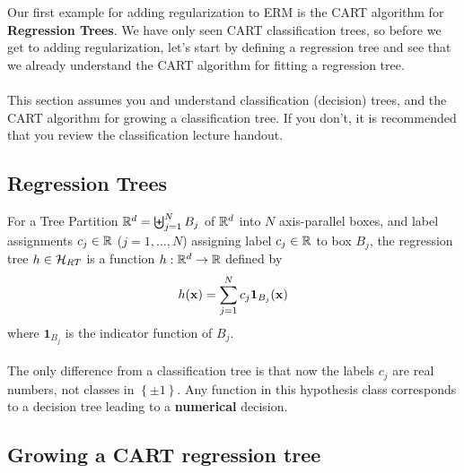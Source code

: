     Our first example for adding regularization to ERM is the CART algorithm for
    {\bf Regression Trees}. We have only seen CART classification trees, so before we
    get to adding regularization, let's
    start by defining a regression tree and see that we already understand the
    CART algorithm for fitting a regression tree.
\\~\\
     This section assumes you and understand classification (decision)
    trees, and the CART algorithm for growing a classification tree. If you
    don't, it is recommended that you review the classification lecture handout. 
   

    

    \subsection{Regression Trees}

    For a Tree Partition $\mathbb{R}^d=\biguplus_{j=1}^N B_j$ of
     $\mathbb{R}^d$ into $N$ axis-parallel boxes, and label assignments $c_j \in \mathbb{R}$
     ($j=1,\ldots, N$) assigning label $c_j\in \mathbb{R}$ to box $B_j$, the
     regression tree $h\in\mathcal{H}_{RT}$ is a function
     $h:\mathbb{R}^d\to\mathbb{R}$
      defined by 
     \[
       h(\mathbf{x}) = \sum_{j=1}^N c_j \mathbf{1}_{B_j}(\mathbf{x})
     \]
     where $\mathbf{1}_{B_j}$ is the indicator function of $B_j$. 
\\~\\
  The only difference from a classification tree is that now the labels $c_j$
  are real numbers, not classes in $\left\{ \pm 1 \right\}$. 
  Any function in this hypothesis class corresponds to a decision tree leading
  to a {\bf numerical} decision. 

    \subsection{Growing a CART regression tree}

